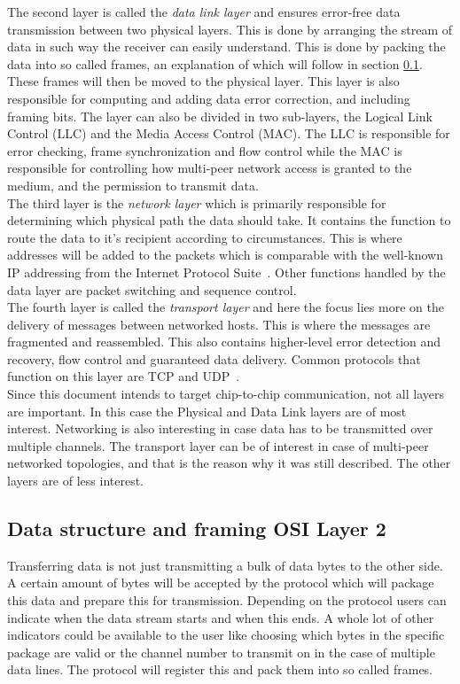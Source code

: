 The second layer is called the \textit{data link layer} and ensures error-free data transmission between two physical layers. This is done by arranging the stream of data in such way the receiver can easily understand. This is done by packing the data into so called frames, an explanation of which will follow in section \ref{subsec:framing}. These frames will then be moved to the physical layer. This layer is also responsible for computing and adding data error correction, and including framing bits.  
The layer can also be divided in two sub-layers, the Logical Link Control (LLC) and the Media Access Control (MAC). The LLC is responsible for error checking, frame synchronization and flow control while the MAC is responsible for controlling how multi-peer network access is granted to the medium, and the permission to transmit data.\\

The third layer is the \textit{network layer} which is primarily responsible for determining which physical path the data should take. It contains the function to route the data to it's recipient according to circumstances. This is where addresses will be added to the packets which is comparable with the well-known IP addressing from the Internet Protocol Suite~\cite{OSI_IP/TCP/UDP}. Other functions handled by the data layer are packet switching and sequence control.\\

The fourth layer is called the \textit{transport layer} and here the focus lies more on the delivery of messages between networked hosts. This is where the messages are fragmented and reassembled. This also contains higher-level error detection and recovery, flow control and guaranteed data delivery. Common protocols that function on this layer are TCP and UDP~\cite{OSI_IP/TCP/UDP}.\\

Since this document intends to target chip-to-chip communication, not all layers are important. In this case the Physical and Data Link layers are of most interest. Networking is also interesting in case data has to be transmitted over multiple channels. The transport layer can be of interest in case of multi-peer networked topologies, and that is the reason why it was still described. The other layers are of less interest. 

\subsection[Data structure and framing]{Data structure and framing \hfill OSI Layer 2}
\label{subsec:framing}
Transferring data is not just transmitting a bulk of data bytes to the other side. A certain amount of bytes will be accepted by the protocol which will package this data and prepare this for transmission. Depending on the protocol users can indicate when the data stream starts and when this ends. A whole lot of other indicators could be available to the user like choosing which bytes in the specific package are valid or the channel number to transmit on in the case of multiple data lines. The protocol will register this and pack them into so called frames.\cite{Framing}

